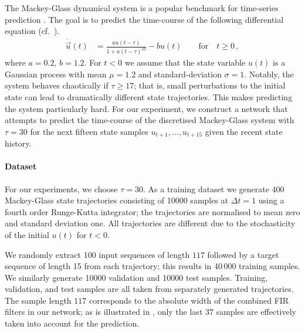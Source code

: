 The Mackey-Glass dynamical system \citep{mackey1977oscillation} is a popular benchmark for time-series prediction \citep[cf.][Section 4.3.1]{mendel2017uncertain}.
The goal is to predict the time-course of the following differential equation (cf.~).
\begin{align*}
	\dot{\vec u}(t) &= \frac{a u(t - \tau)}{1 + u(t - \tau)^{10}} - b u(t) \quad\quad \text{for} \quad t \geq 0\,,
\end{align*}
where $a = 0.2$, $b = 1.2$.
For $t < 0$ we assume that the state variable $u(t)$ is a Gaussian process with mean $\mu = 1.2$ and standard-deviation $\sigma = 1$.
Notably, the system behaves chaotically if $\tau \geq 17$; that is, small perturbations to the initial state can lead to dramatically different state trajectories.
This makes predicting the system particularly hard.
For our experiment, we construct a network that attempts to predict the time-course of the discretised Mackey-Glass system with $\tau = 30$ for the next fifteen state samples $u_{t + 1}, \ldots, u_{t + 15}$ given the recent state history.

\paragraph{Dataset}
For our experiments, we choose $\tau = 30$.
As a training dataset we generate $400$ Mackey-Glass state trajectories consisting of \num{10000} samples at $\Delta t = 1$ using a fourth order Runge-Kutta integrator; the trajectories are normalised to mean zero and standard deviation one.
All trajectories are different due to the stochasticity of the initial $u(t)$ for $t < 0$.

We randomly extract 100 input sequences of length $117$ followed by a target sequence of length 15 from each trajectory; this results in 40\,000 training samples. We similarly generate \num{10000} validation and \num{10000} test samples.
Training, validation, and test samples are all taken from separately generated trajectories.
The sample length $117$ corresponds to the absolute width of the combined FIR filters in our network; as is illustrated in , only the last $37$ samples are effectively taken into account for the prediction.

